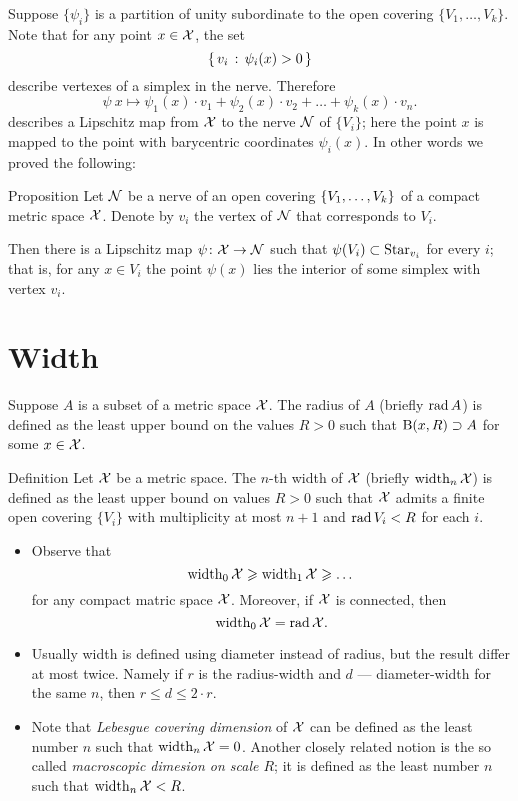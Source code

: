 Suppose $\{\psi_i\}$ is  
a partition of unity subordinate to the open covering $\{V_1,\dots,V_k\}$.
Note that for any point $x\in {\mathcal{X}}$, the set
$$\left\{\,{v_i}\,:\,{\psi_i(x)>0}\,\right\}$$
describe vertexes of a simplex in the nerve.
Therefore 
$$\psi\:x\mapsto \psi_1(x)\cdot v_1+\psi_2(x)\cdot v_2+\dots+\psi_k(x)\cdot v_n.$$
describes a Lipschitz map from ${\mathcal{X}}$ to the nerve $\mathcal{N}$ of $\{V_i\}$;
here the point $x$ is mapped to the point with barycentric coordinates $\psi_i(x)$.
In other words we proved the following:

\begin{thm}{Proposition}\label{prop:space->nerve}
Let $\mathcal{N}$ be a nerve of an open covering $\{V_1,\z\dots,V_k\}$ of a compact metric space $\mathcal{X}$.
Denote by $v_i$ the vertex of $\mathcal{N}$ that corresponds to $V_i$.

Then there is a Lipschitz map $\psi\colon\mathcal{X}\to\mathcal{N}$ such that $\psi(V_i)\z\subset\Star_{v_i}$ for every $i$;
that is, for any $x\in V_i$ the point $\psi(x)$ lies the interior of some simplex with vertex $v_i$.
\end{thm}


\section{Width}

Suppose $A$ is a subset of a metric space $\mathcal{X}$.
The radius of $A$ (briefly $\mathop{\rm rad}\nolimits A$) is defined as the least upper bound on the values $R>0$ such that $\mathrm{B}{}(x,R)\supset A$ for some $x\in \mathcal{X}$.

\begin{thm}{Definition}\label{def:width}
Let $\mathcal{X}$ be a metric space.
The $n$-th width of $\mathcal{X}$ (briefly $\operatorname{\rm width}\nolimits_n\mathcal{X}$) is defined as the least upper bound on values $R>0$ such that $\mathcal{X}$ admits a finite open covering $\{V_i\}$ with multiplicity at most $n+1$ and $\mathop{\rm rad}\nolimits V_i< R$ for each $i$.
\end{thm}

\begin{itemize}
\item Observe that 
\[\operatorname{\rm width}\nolimits_0\mathcal{X}\geqslant\operatorname{\rm width}\nolimits_1\mathcal{X}\geqslant\dots\]
for any compact matric space $\mathcal{X}$.
Moreover, if $\mathcal{X}$ is connected, then 
\[\operatorname{\rm width}\nolimits_0\mathcal{X}=\mathop{\rm rad}\nolimits\mathcal{X}.\]
\item 
Usually width is defined using diameter instead of radius, but the result differ at most twice.
Namely if $r$ is the radius-width and $d$ --- diameter-width for the same $n$, then 
$r\le d\le 2\cdot r$.

\item Note that \emph{Lebesgue covering dimension} of $\mathcal{X}$ can be defined as the least number $n$ such that $\operatorname{\rm width}\nolimits_n\mathcal{X}=0$.
Another closely related notion is the so called \emph{macroscopic dimesion on scale $R$};
it is defined as the  least number $n$ such that $\operatorname{\rm width}\nolimits_n\mathcal{X}<R$.
\end{itemize}

